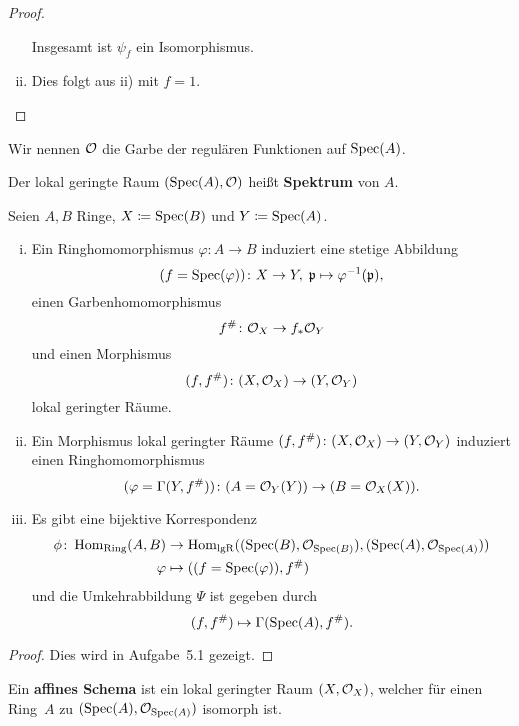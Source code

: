 \begin{prop}
\begin{proof}
\begin{enumerate}[i)]
			Insgesamt ist $\psi_f$ ein Isomorphismus.
			\item Dies folgt aus ii) mit $f=1$.
		\end{enumerate}
	\end{proof}
\end{prop}

\begin{bem*}
	Wir nennen $\mathcal{O}$ die Garbe der regulären Funktionen auf $\operatorname{Spec}(A)$.
\end{bem*}

\begin{defn}
	Der lokal geringte Raum $(\operatorname{Spec}(A), \mathcal{O})$ heißt \textbf{Spektrum} von $A$.
\end{defn}

\begin{prop}
\label{prop:4.14}
	Seien $A, B$ Ringe, $X \coloneqq \operatorname{Spec}(B)$ und $Y \coloneqq \operatorname{Spec}(A)$.
	\begin{enumerate}[i)]
		\item Ein Ringhomomorphismus $\varphi\colon A \to B$ induziert eine stetige Abbildung
		\[
			(f = \operatorname{Spec}(\varphi))\colon X \to Y,\; \mathfrak{p} \mapsto \varphi^{-1}(\mathfrak{p}),
		\]
		einen Garbenhomomorphismus
		\[
			f^{\#}\colon \mathcal{O}_X \to f_*\mathcal{O}_Y
		\]
		und einen Morphismus
		\[
			(f,f^{\#})\colon (X,\mathcal{O}_X)\to (Y,\mathcal{O}_Y)
		\]
		lokal geringter Räume.
		\item Ein Morphismus lokal geringter Räume $(f,f^{\#})\colon (X,\mathcal{O}_X)\to(Y,\mathcal{O}_Y)$ induziert einen Ringhomomorphismus
		\[
			(\varphi = \Gamma(Y,f^{\#}))\colon (A = \mathcal{O}_Y(Y)) \to (B=\mathcal{O}_X(X)).
		\]
		\item Es gibt eine bijektive Korrespondenz
		\begin{align*}
			\phi\colon \operatorname{Hom}_{\operatorname{Ring}}(A,B) &\to \operatorname{Hom}_{\operatorname{lgR}}((\operatorname{Spec}(B),\mathcal{O}_{\operatorname{Spec}(B)}),(\operatorname{Spec}(A),\mathcal{O}_{\operatorname{Spec}(A)}))\\
			\varphi & \mapsto ((f=\operatorname{Spec}(\varphi)),f^{\#})
		\end{align*}
		und die Umkehrabbildung $\Psi$ ist gegeben durch
		\[
			(f,f^{\#})\mapsto \Gamma(\operatorname{Spec}(A),f^{\#}).
		\]
	\end{enumerate}
	\begin{proof}
		Dies wird in Aufgabe~5.1 gezeigt.
	\end{proof}
\end{prop}

\begin{defn}
	Ein \textbf{affines Schema} ist ein lokal geringter Raum $(X,\mathcal{O}_X)$, welcher für einen Ring~$A$ zu $(\operatorname{Spec}(A),\mathcal{O}_{\operatorname{Spec}(A)})$ isomorph ist.
\end{defn}

